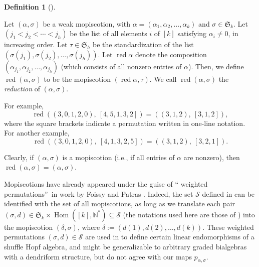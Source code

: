 \documentclass[numbers=enddot,12pt,final,onecolumn,notitlepage]{scrartcl}%
\theoremstyle{definition}
\newtheorem{defi}[theo]{Definition}
\newenvironment{definition}[1][]
{\begin{defi}[#1]\begin{leftbar}}
{\end{leftbar}\end{defi}}
\begin{document}
\begin{definition}
\label{def.red-wmopis}Let $\left(  \alpha,\sigma\right)  $ be a weak
mopiscotion, with $\alpha=\left(  \alpha_{1},\alpha_{2},\ldots,\alpha
_{k}\right)  $ and $\sigma\in\mathfrak{S}_{k}$. Let $\left(  j_{1}%
<j_{2}<\cdots<j_{h}\right)  $ be the list of all elements $i$ of $\left[
k\right]  $ satisfying $\alpha_{i}\neq0$, in increasing order. Let $\tau
\in\mathfrak{S}_{h}$ be the standardization of the list $\left(  \sigma\left(
j_{1}\right)  ,\sigma\left(  j_{2}\right)  ,\ldots,\sigma\left(  j_{h}\right)
\right)  $. Let $\operatorname*{red}\alpha$ denote the composition $\left(
\alpha_{j_{1}},\alpha_{j_{2}},\ldots,\alpha_{j_{h}}\right)  $ (which consists
of all nonzero entries of $\alpha$). Then, we define $\operatorname*{red}%
\left(  \alpha,\sigma\right)  $ to be the mopiscotion $\left(
\operatorname*{red}\alpha,\tau\right)  $. We call $\operatorname*{red}\left(
\alpha,\sigma\right)  $ the \emph{reduction} of $\left(  \alpha,\sigma\right)
$.
\end{definition}

For example,%
\[
\operatorname*{red}\left(  \left(  3,0,1,2,0\right)  ,\ \left[
4,5,1,3,2\right]  \right)  =\left(  \left(  3,1,2\right)  ,\ \left[
3,1,2\right]  \right)  ,
\]
where the square brackets indicate a permutation written in one-line notation.
For another example,%
\[
\operatorname*{red}\left(  \left(  3,0,1,2,0\right)  ,\ \left[
4,1,3,2,5\right]  \right)  =\left(  \left(  3,1,2\right)  ,\ \left[
3,2,1\right]  \right)  .
\]


Clearly, if $\left(  \alpha,\sigma\right)  $ is a mopiscotion (i.e., if all
entries of $\alpha$ are nonzero), then $\operatorname*{red}\left(
\alpha,\sigma\right)  =\left(  \alpha,\sigma\right)  $. \medskip

Mopiscotions have already appeared under the guise of \textquotedblleft
weighted permutations\textquotedblright\ in work by Foissy and Patras
\cite{FoiPat13}. Indeed, the set $\mathcal{S}$ defined in \cite[\S 3]%
{FoiPat13} can be identified with the set of all mopiscotions, as long as we
translate each pair $\left(  \sigma,d\right)  \in\mathfrak{S}_{k}%
\times\operatorname*{Hom}\left(  \left[  k\right]  ,\mathbb{N}^{\ast}\right)
\subseteq\mathcal{S}$ (the notations used here are those of \cite{FoiPat13})
into the mopiscotion $\left(  \delta,\sigma\right)  $, where $\delta:=\left(
d\left(  1\right)  ,d\left(  2\right)  ,\ldots,d\left(  k\right)  \right)  $.
These weighted permutations $\left(  \sigma,d\right)  \in\mathcal{S}$ are used
in \cite{FoiPat13} to define certain linear endomorphisms of a shuffle Hopf
algebra, and might be generalizable to arbitrary graded bialgebras with a
dendriform structure, but do not agree with our maps $p_{\alpha,\sigma}$.
\end{document}
